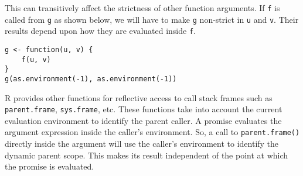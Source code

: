 \documentclass[review,nonacm,screen,acmsmall,anonymous=true]{acmart}
\newcommand{\code}[1]{\lstinline |#1|\xspace}
\begin{document}
This can transitively affect the strictness of other function arguments. If
\code{f} is called from \code{g} as shown below, we will have to make \code{g}
non-strict in \code{u} and \code{v}. Their results depend upon how they are
evaluated inside \code{f}.

\begin{lstlisting}
g <- function(u, v) {
    f(u, v)
}
g(as.environment(-1), as.environment(-1))
\end{lstlisting}
% 

R provides other functions for reflective access to call stack frames such as
\code{parent.frame}, \code{sys.frame}, etc. These functions take into account
the current evaluation environment to identify the parent caller. A promise
evaluates the argument expression inside the caller's environment. So, a call to
\code{parent.frame()} directly inside the argument will use the caller's
environment to identify the dynamic parent scope. This makes its result
independent of the point at which the promise is evaluated.
\end{document}

